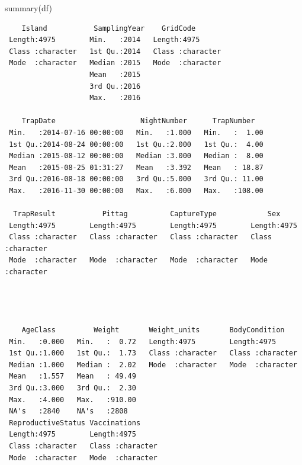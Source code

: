 \documentclass[
  letterpaper,
]{report}
\newenvironment{Shaded}{\begin{snugshade}}{\end{snugshade}}
\newcommand{\FunctionTok}[1]{\textcolor[rgb]{0.28,0.35,0.67}{#1}}
\newcommand{\NormalTok}[1]{\textcolor[rgb]{0.00,0.23,0.31}{#1}}
\begin{document}
\begin{Shaded}
\begin{Highlighting}[]
\FunctionTok{summary}\NormalTok{(df)}
\end{Highlighting}
\end{Shaded}

\begin{verbatim}
    Island           SamplingYear    GridCode        
 Length:4975        Min.   :2014   Length:4975       
 Class :character   1st Qu.:2014   Class :character  
 Mode  :character   Median :2015   Mode  :character  
                    Mean   :2015                     
                    3rd Qu.:2016                     
                    Max.   :2016                     
                                                     
    TrapDate                    NightNumber      TrapNumber    
 Min.   :2014-07-16 00:00:00   Min.   :1.000   Min.   :  1.00  
 1st Qu.:2014-08-24 00:00:00   1st Qu.:2.000   1st Qu.:  4.00  
 Median :2015-08-12 00:00:00   Median :3.000   Median :  8.00  
 Mean   :2015-08-25 01:31:27   Mean   :3.392   Mean   : 18.87  
 3rd Qu.:2016-08-18 00:00:00   3rd Qu.:5.000   3rd Qu.: 11.00  
 Max.   :2016-11-30 00:00:00   Max.   :6.000   Max.   :108.00  
                                                               
  TrapResult           Pittag          CaptureType            Sex           
 Length:4975        Length:4975        Length:4975        Length:4975       
 Class :character   Class :character   Class :character   Class :character  
 Mode  :character   Mode  :character   Mode  :character   Mode  :character  
                                                                            
                                                                            
                                                                            
                                                                            
    AgeClass         Weight       Weight_units       BodyCondition     
 Min.   :0.000   Min.   :  0.72   Length:4975        Length:4975       
 1st Qu.:1.000   1st Qu.:  1.73   Class :character   Class :character  
 Median :1.000   Median :  2.02   Mode  :character   Mode  :character  
 Mean   :1.557   Mean   : 49.49                                        
 3rd Qu.:3.000   3rd Qu.:  2.30                                        
 Max.   :4.000   Max.   :910.00                                        
 NA's   :2840    NA's   :2808                                          
 ReproductiveStatus Vaccinations      
 Length:4975        Length:4975       
 Class :character   Class :character  
 Mode  :character   Mode  :character  
                                      
                                      
                                      
                                      
\end{verbatim}
\end{document}
